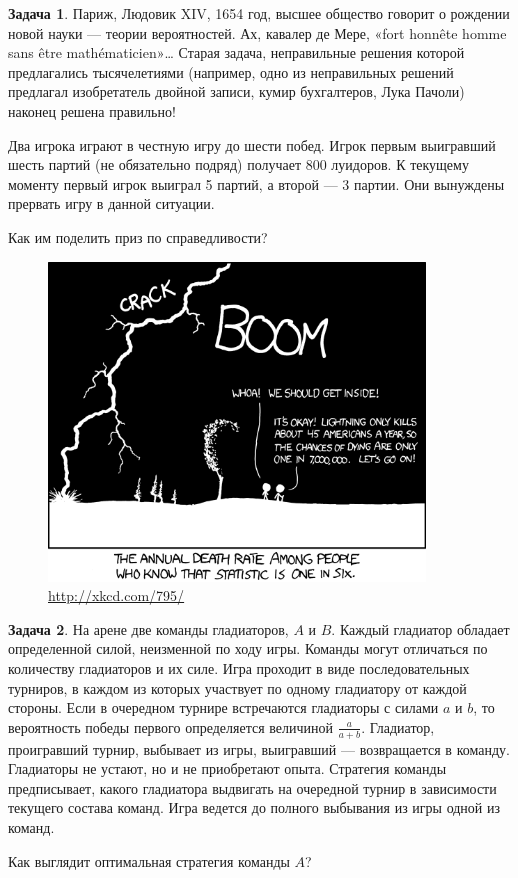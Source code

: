 \documentclass[nobib]{tufte-handout}
\theoremstyle{definition}
\newtheorem{problem}{Задача}
\begin{document}
\begin{problem}
Париж, Людовик XIV, 1654 год, высшее общество говорит о рождении новой науки — теории вероятностей. Ах, кавалер де Мере, «fort honnête homme sans être mathématicien»\ldots {} Старая задача, неправильные решения которой предлагались тысячелетиями (например, одно из неправильных решений предлагал изобретатель двойной записи, кумир бухгалтеров, Лука Пачоли) наконец решена правильно!


Два игрока играют в честную игру до шести побед. Игрок первым выигравший шесть партий (не обязательно подряд) получает 800 луидоров. К текущему моменту первый игрок выиграл 5 партий, а второй — 3 партии. Они вынуждены прервать игру в данной ситуации.


Как им поделить приз по справедливости?

\begin{center}
\begin{figure}[t]
  \includegraphics[width=10cm]{images/conditional.png}
  \caption{\url{http://xkcd.com/795/}}
\end{figure}
\end{center}

\end{problem}


\begin{problem}
На арене две команды гладиаторов,  $A$  и  $B$. Каждый гладиатор обладает определенной силой, неизменной по ходу игры. Команды могут отличаться по количеству гладиаторов и их силе. Игра проходит в виде последовательных турниров, в каждом из которых участвует по одному гладиатору от каждой стороны. Если в очередном турнире встречаются гладиаторы с силами  $a$  и  $b$, то вероятность победы первого определяется величиной  $\frac{a}{a+b}$. Гладиатор, проигравший турнир, выбывает из игры, выигравший — возвращается в команду. Гладиаторы не устают, но и не приобретают опыта. Стратегия команды предписывает, какого гладиатора выдвигать на очередной турнир в зависимости текущего состава команд. Игра ведется до полного выбывания из игры одной из команд.

Как выглядит оптимальная стратегия команды $A$?

\end{problem}
\end{document}
